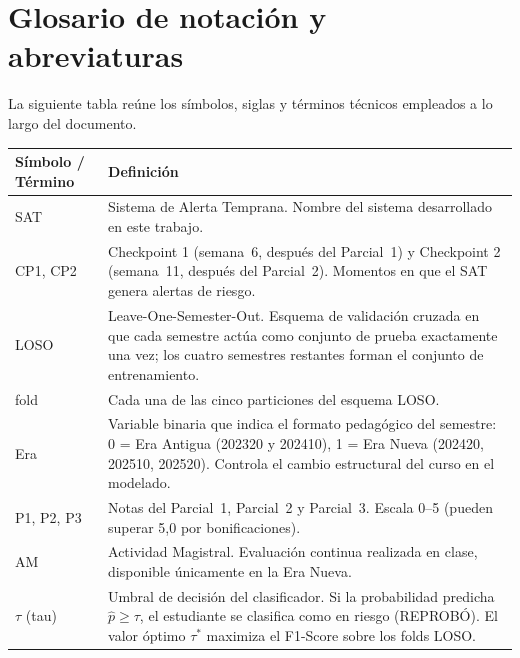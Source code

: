 \documentclass[12pt, letterpaper, openany]{report}
\begin{document}
\chapter*{Glosario de notación y abreviaturas}

La siguiente tabla reúne los símbolos, siglas y términos técnicos empleados a lo largo del documento.

\vspace{0.4cm}
\begin{longtable}{p{3.6cm} p{10.2cm}}
  \toprule
  Símbolo / Término & Definición \\
  \midrule
  \endhead
  \bottomrule
  \endfoot

  SAT & Sistema de Alerta Temprana. Nombre del sistema desarrollado en este trabajo. \\[4pt]

  CP1, CP2 & Checkpoint 1 (semana~6, después del Parcial~1) y Checkpoint 2 (semana~11, después del Parcial~2). Momentos en que el SAT genera alertas de riesgo. \\[4pt]

  LOSO & Leave-One-Semester-Out. Esquema de validación cruzada en que cada semestre actúa como conjunto de prueba exactamente una vez; los cuatro semestres restantes forman el conjunto de entrenamiento. \\[4pt]

  fold & Cada una de las cinco particiones del esquema LOSO. \\[4pt]

  Era & Variable binaria que indica el formato pedagógico del semestre: 0 = Era Antigua (202320 y 202410), 1 = Era Nueva (202420, 202510, 202520). Controla el cambio estructural del curso en el modelado. \\[4pt]

  P1, P2, P3 & Notas del Parcial~1, Parcial~2 y Parcial~3. Escala 0--5 (pueden superar 5,0 por bonificaciones). \\[4pt]

  AM & Actividad Magistral. Evaluación continua realizada en clase, disponible únicamente en la Era Nueva. \\[4pt]

  $\tau$ (tau) & Umbral de decisión del clasificador. Si la probabilidad predicha $\hat{p} \geq \tau$, el estudiante se clasifica como en riesgo (REPROBÓ). El valor óptimo $\tau^*$ maximiza el F1-Score sobre los folds LOSO. \\[4pt]


\end{longtable}
\end{document}
